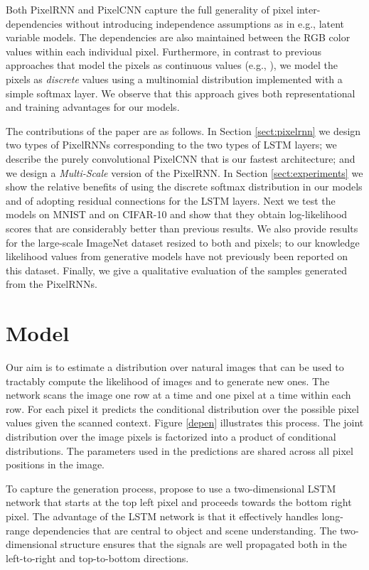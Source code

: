 \documentclass{article}
\begin{document}
Both PixelRNN and PixelCNN capture the full generality of pixel inter-dependencies without introducing independence assumptions as in e.g., latent variable models. The dependencies are also maintained between the RGB color values within each individual pixel. 
Furthermore, in contrast to previous approaches that model the pixels as continuous values (e.g., \citet{theis2015generative, gregor2013deep}), we model the pixels as \emph{discrete} values using a multinomial distribution implemented with a simple softmax layer. We observe that this approach gives both representational and training advantages for our models.


The contributions of the paper are as follows. In Section \ref{sect:pixelrnn} we design two types of PixelRNNs corresponding to the two types of LSTM layers; we describe the purely convolutional PixelCNN that is our fastest architecture; and we design a \emph{Multi-Scale} version of the PixelRNN.
In Section \ref{sect:experiments} we show the relative benefits of using the discrete softmax distribution in our models and of adopting residual connections for the LSTM layers. Next we test the models on MNIST and on CIFAR-10 and show that they obtain log-likelihood scores that are considerably better than previous results. We also provide results for the large-scale ImageNet dataset resized to both  and  pixels; to our knowledge likelihood values from generative models have not previously been reported on this dataset. Finally, we give a qualitative evaluation of the samples generated from the PixelRNNs. 


 \section{Model}
\label{framework}


Our aim is to estimate a distribution over natural images that can be used to tractably compute the likelihood of images and to generate new ones. The network scans the image one row at a time and one pixel at a time within each row.  For each pixel it predicts the conditional distribution over the possible pixel values given the scanned context. Figure \ref{depen} illustrates this process. The joint distribution over the image pixels is factorized into a product of conditional distributions. The parameters used in the predictions are shared across all pixel positions in the image. 

To capture the generation process, \citet{theis2015generative} propose to use a two-dimensional LSTM network \cite{graves2009offline} that starts at the top left pixel and proceeds towards the bottom right pixel. The advantage of the LSTM network is that it effectively handles long-range dependencies that are central to object and scene understanding. The two-dimensional structure ensures that the signals are well propagated both in the left-to-right and top-to-bottom directions. 
\end{document}

